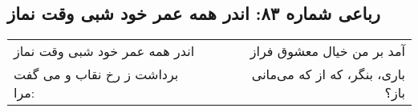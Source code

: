 \begin{center}
\section*{رباعی شماره ۸۳: اندر همه عمر خود شبی وقت نماز}
\label{sec:083}
\begin{longtable}{l p{0.5cm} r}
اندر همه عمر خود شبی وقت نماز
&&
آمد بر من خیال معشوق فراز
\\
برداشت ز رخ نقاب و می گفت مرا:
&&
باری، بنگر، که از که می‌مانی باز؟
\\
\end{longtable}
\end{center}
